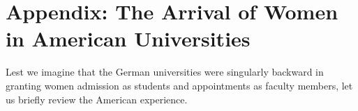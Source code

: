 \documentclass[twoside,symmetric]{tufte-handout}
\begin{document}
%
%
%
%
\vspace*{-6pt}
\section{Appendix: The Arrival of Women in American Universities\label{app:women}}
Lest we imagine that the German universities were singularly backward in granting women admission as students and appointments as faculty members, let us briefly review the American experience.
\end{document}
